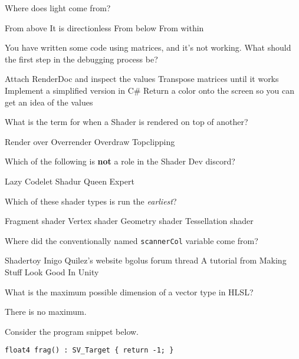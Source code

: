 \documentclass{exam}
\begin{document}
\begin{questions}
\question Where does light come from?
\begin{checkboxes}
 \choice From above
 \choice It is directionless
 \choice From below
 \choice From within
\end{checkboxes}

\question You have written some code using matrices, and it's not working. What should the first step in the debugging process be?
\begin{checkboxes}
 \choice Attach RenderDoc and inspect the values
 \choice Transpose matrices until it works
 \choice Implement a simplified version in C\#
 \choice Return a color onto the screen so you can get an idea of the values
\end{checkboxes}

\question What is the term for when a Shader is rendered on top of another?
\begin{checkboxes}
 \choice Render over
 \choice Overrender
 \choice Overdraw
 \choice Topclipping
\end{checkboxes}

\question Which of the following is \textbf{not} a role in the Shader Dev discord?
\begin{checkboxes}
 \choice Lazy
 \choice Codelet
 \choice Shadur Queen
 \choice Expert
\end{checkboxes}

\question Which of these shader types is run the \textit{earliest}?
\begin{checkboxes}
 \choice Fragment shader
 \choice Vertex shader
 \choice Geometry shader
 \choice Tessellation shader
\end{checkboxes}

\question Where did the conventionally named \texttt{scannerCol} variable come from?
\begin{checkboxes}
 \choice Shadertoy
 \choice Inigo Quilez's website
 \choice bgolus forum thread
 \choice A tutorial from Making Stuff Look Good In Unity
\end{checkboxes}

\question What is the maximum possible dimension of a vector type in HLSL?
\begin{checkboxes}
 \choice There is no maximum.
\end{checkboxes}

\question Consider the program snippet below.

\begin{verbatim}
float4 frag() : SV_Target { return -1; }
\end{verbatim}


\end{questions}
\end{document}
